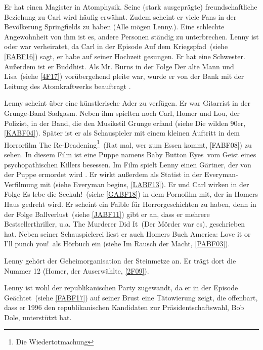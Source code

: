 Er hat einen Magister in Atomphysik. Seine (stark ausgeprägte) freundschaftliche Beziehung zu Carl wird häufig erwähnt. Zudem scheint er viele Fans in der Bevölkerung Springfields zu haben (\glqq Alle mögen Lenny.\grqq ). Eine schlechte Angewohnheit von ihm ist es, andere Personen ständig zu unterbrechen. Lenny ist oder war verheiratet, da Carl in der Episode \glqq Auf dem Kriegspfad\grqq\ (siehe \ref{EABF16}) sagt, er habe auf seiner Hochzeit gesungen. Er hat eine Schwester. Außerdem ist er Buddhist. Als Mr. Burns in der Folge \glqq Der alte Mann und Lisa\grqq\ (siehe \ref{4F17}) vorübergehend pleite war, wurde er von der Bank mit der Leitung des Atomkraftwerks beauftragt \cite{SpringfieldAt}.

Lenny scheint über eine künstlerische Ader zu verfügen. Er war Gitarrist in der Grunge-Band \glqq Sadgasm\grqq . Neben ihm spielten noch Carl, Homer und Lou, der Polizist, in der Band, die den Musikstil Grunge erfand (siehe \glqq Die wilden 90er\grqq , \ref{KABF04}). Später ist er als Schauspieler mit einem kleinen Auftritt in dem Horrorfilm \glqq The Re-Deaden\-ing\footnote{Die Wiedertotmachung}\grqq\ (\glqq Rat mal, wer zum Essen kommt\grqq , \ref{FABF08}) zu sehen. In diesem Film ist eine Puppe namens \glqq Baby Button Eyes\grqq\ vom Geist eines psychopathischen Killers besessen. Im Film spielt Lenny einen Gärtner, der von der Puppe ermordet wird \cite{WikiEnLenny}. Er wirkt außerdem als Statist in der Everyman-Verfilmung mit (siehe \glqq Everyman begins\grqq, \ref{LABF13}). Er und Carl wirken in der Folge \glqq Es lebe die Seekuh!\grqq\ (siehe \ref{GABF18}) in dem Pornofilm mit, der in Homers Haus gedreht wird. Er scheint ein Faible für Horrorgeschichten zu haben, denn in der Folge \glqq Ballverlust\grqq\ (siehe \ref{JABF11}) gibt er an, dass er mehrere Bestsellerthriller, u.a. \glqq The Murderer Did It\grqq\ (Der Mörder war es), geschrieben hat. Neben seiner Schauspielerei liest er auch Homers Buch \glqq America: Love it or I'll punch you!\grqq\ als Hörbuch ein (siehe \glqq Im Rausch der Macht\grqq , \ref{PABF03}).

Lenny gehört der Geheimorganisation der Steinmetze an. Er trägt dort die Nummer 12 (\glqq Homer, der Auserwählte\grqq, \ref{2F09}).

Lenny ist wohl der republikanischen Party zugewandt, da er in der Episode \glqq Geächtet\grqq\ (siehe \ref{FABF17}) auf seiner Brust eine Tätowierung zeigt, die offenbart, dass er 1996 den republikanischen Kandidaten zur Präsidentschaftswahl, Bob Dole, unterstützt hat.

